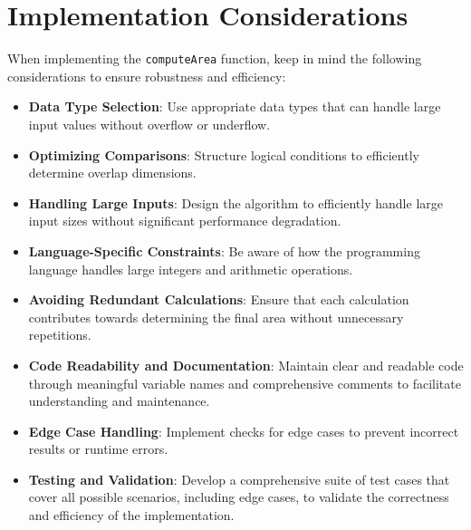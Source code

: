 \section*{Implementation Considerations}

When implementing the \texttt{computeArea} function, keep in mind the following considerations to ensure robustness and efficiency:

\begin{itemize}
    \item \textbf{Data Type Selection}: Use appropriate data types that can handle large input values without overflow or underflow.
    
    \item \textbf{Optimizing Comparisons}: Structure logical conditions to efficiently determine overlap dimensions.
    
    \item \textbf{Handling Large Inputs}: Design the algorithm to efficiently handle large input sizes without significant performance degradation.
    
    \item \textbf{Language-Specific Constraints}: Be aware of how the programming language handles large integers and arithmetic operations.
    
    \item \textbf{Avoiding Redundant Calculations}: Ensure that each calculation contributes towards determining the final area without unnecessary repetitions.
    
    \item \textbf{Code Readability and Documentation}: Maintain clear and readable code through meaningful variable names and comprehensive comments to facilitate understanding and maintenance.
    
    \item \textbf{Edge Case Handling}: Implement checks for edge cases to prevent incorrect results or runtime errors.
    
    \item \textbf{Testing and Validation}: Develop a comprehensive suite of test cases that cover all possible scenarios, including edge cases, to validate the correctness and efficiency of the implementation.
    

\end{itemize}
